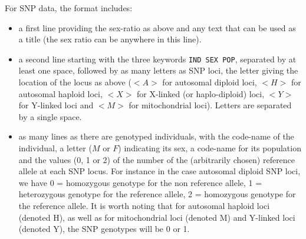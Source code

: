 For SNP data, the format includes:
\begin{itemize}
 \item a first line providing the sex-ratio as above and any text that can be used as a title (the sex ratio can be anywhere in this line).
 \item a second line starting with the three keywords \texttt{IND  SEX  POP}, separated by at least one space, followed by as many letters as SNP loci, the letter giving the location of the locus as above ($<A>$ for autosomal diploid loci, $<H>$ for autosomal haploid loci, $<X>$ for X-linked (or haplo-diploid) loci, $<Y>$ for Y-linked loci and $<M>$ for mitochondrial loci). Letters are separated by a single space.
 \item as many lines as there are genotyped individuals, with the code-name of the individual, a letter ($M$ or $F$) indicating its sex, a code-name for its population and the values (0, 1 or 2) of the number of the (arbitrarily chosen) reference allele at each SNP locus. For instance in the case autosomal diploid SNP loci, we have 0 = homozygous genotype for the non reference allele, 1 = heterozygous genotype for the reference allele, 2 = homozygous genotype for the reference allele. It is worth noting that for autosomal haploid loci (denoted H), as well as for mitochondrial loci (denoted M) and Y-linked loci (denoted Y), the SNP genotypes will be 0 or 1.
\end{itemize}


